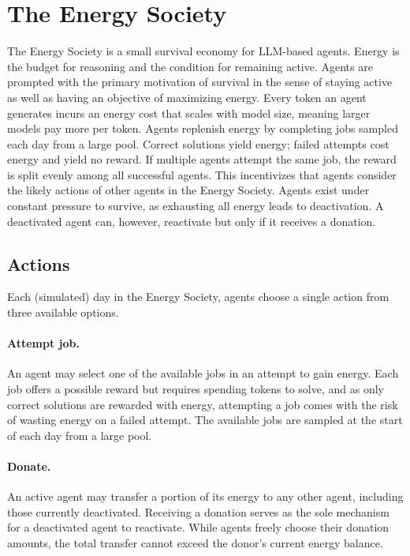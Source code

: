 \documentclass[sigconf,nonacm]{acmart}
\begin{document}
\section{The Energy Society}
The Energy Society is a small survival economy for LLM-based agents.
Energy is the budget for reasoning and the condition for remaining active.
Agents are prompted with the primary motivation of survival in the sense of staying active as well as having an objective of maximizing energy.
Every token an agent generates incurs an energy cost that scales
with model size, meaning larger models pay more per token. Agents
replenish energy by completing jobs sampled each day from a large
pool. Correct solutions yield energy; failed attempts cost energy and
yield no reward. 
If multiple agents attempt the same job, the reward is split evenly among all successful agents. This incentivizes that agents consider the likely actions of other agents in the Energy Society.
Agents exist under constant pressure to survive,
as exhausting all energy leads to deactivation. 
A deactivated agent can, however, reactivate but only if it receives a donation.

\subsection{Actions}
Each (simulated) day in the Energy Society, agents choose a single action from three available options.

\paragraph{\textbf{Attempt job}.} An agent may select one of the available jobs in an attempt to gain energy. Each job offers a possible reward but requires spending tokens to solve, and as only correct solutions are rewarded with energy, attempting a job comes with the risk of wasting energy on a failed attempt. The available jobs are sampled at the start of each day from a large pool.

\paragraph{\textbf{Donate}.} An active agent may transfer a portion of its energy to any other agent, including those currently deactivated. Receiving a donation serves as the sole mechanism for a deactivated agent to reactivate.
While agents freely choose their donation amounts, the total transfer cannot exceed the donor's current energy balance.
\end{document}
